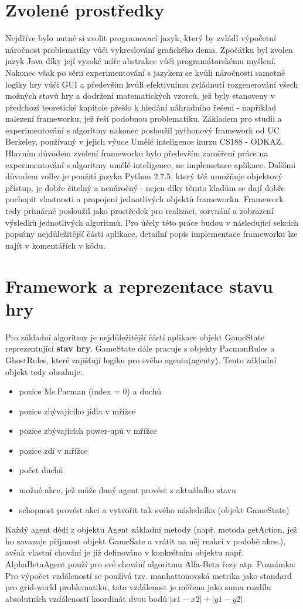 \section{Zvolené prostředky}
Nejdříve bylo nutné si zvolit programovací jazyk, který by zvládl výpočetní náročnost problematiky vůči vykreslování grafického dema. Zpočátku byl zvolen jazyk Java díky její vysoké míře abstrakce vůči programátorskému myšlení. Nakonec však po sérii experimentování s jazykem se kvůli náročnosti samotné logiky hry vůči GUI a především kvůli efektivnímu zvládnutí rozgenerování všech možných stavů hry a dodržení matematických vzorců, jež byly stanoveny v předchozí teoretické kapitole přešlo k hledání náhradního řešení - například nalezení frameworku, jež řeší podobnou problematiku. Základem pro studii a experimentování s algoritmy nakonec posloužil pythonový framework od UC Berkeley, používaný v jejich výuce Umělé inteligence kurzu CS188 - ODKAZ. Hlavním důvodem zvolení frameworku bylo především zaměření práce na experimentování s algoritmy umělé inteligence, ne implemetace aplikace. Dalšími důvodem volby je použití jazyka Python 2.7.5, který též umožňuje objektový přístup, je dobře čitelný a nenáročný - nejen díky těmto kladům se dají dobře pochopit vlastnosti a propojení jednotlivých objektů frameworku. Framework tedy primárně posloužil jako prostředek pro realizaci, sorvnání a zobrazení výsledků jednotlivých algoritmů.
Pro účely této práce budou v následující sekcích popsány nejdůležitější části aplikace, detailní popis implementace frameworku lze najít v komentářích v kódu.

\section{Framework a reprezentace stavu hry}
Pro základní algoritmy je nejdůležitější částí aplikace objekt GameState reprezentující \textbf{stav hry}. GameState dále pracuje s objekty PacmanRules a GhostRules, které zajišťují logiku pro svého agenta(agenty).
Tento základní objekt tedy obsahuje:
\begin{itemize}
\item pozice Ms.Pacman (index = 0) a duchů
\item pozice zbývajícího jídla v mřížce
\item pozice zbývajících power-upů v mřížce
\item pozice zdí v mřížce
\item počet duchů
\item možné akce, jež může daný agent provést z aktuálního stavu
\item schopnost provést akci a vytvořit tak svého následníka (objekt GameState)
\end{itemize}
Každý agent dědí z objektu Agent základní metody (např. metoda getAction, jež ho zavazuje přijmout objekt GameSate a vrátit na něj reakci v podobě akce.), avšak vlastní chování je již definováno v konkrétním objektu např. AlphaBetaAgent použí pro své chování algoritmu Alfa-Beta řezy atp.
Poznámka: Pro výpočet vzdáleností se používá tzv. manhattonovská metrika jako standard pro grid-world problematiku, tato vzdálenost je měřena jako suma rozdílu absolutních vzdáleností koordinát dvou bodů $\left|x1-x2\right|+\left|y1-y2\right|$.

